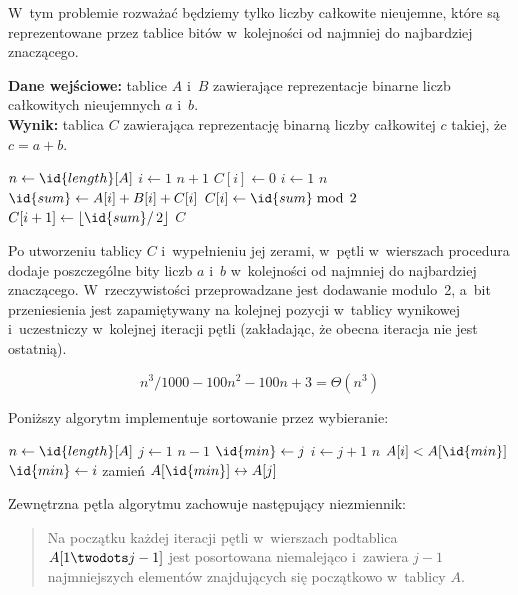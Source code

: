 \exercise %
W~tym problemie rozważać będziemy tylko liczby całkowite nieujemne, które są reprezentowane przez tablice bitów w~kolejności od najmniej do najbardziej znaczącego.

\bigskip
\noindent\textbf{Dane wejściowe:}  tablice $A$ i~$B$ zawierające reprezentacje binarne  liczb całkowitych nieujemnych $a$ i~$b$.\\
\textbf{Wynik:}  tablica $C$ zawierająca reprezentację binarną  liczby całkowitej $c$ takiej, że $c=a+b$.

\begin{codebox}
\li	$n\gets\id{length}[A]$
\li	\For $i\gets1$ \To $n+1$
\li		\Do $C[i]\gets0$
		\End
\li	\For $i\gets1$ \To $n$ \label{li:binary-add-for-begin}
\li		\Do
			$\id{sum}\gets A[i]+B[i]+C[i]$
\li			$C[i]\gets\id{sum}\bmod\,2$
\li			$C[i+1]\gets\lfloor\id{sum}/\,2\rfloor$
		\End \label{li:binary-add-for-end}
\li	\Return $C$
\end{codebox}

Po utworzeniu tablicy $C$ i~wypełnieniu jej zerami, w~pętli  w~wierszach \twodashes{\ref{li:binary-add-for-begin}}{\ref{li:binary-add-for-end}} procedura dodaje poszczególne bity liczb $a$ i~$b$ w~kolejności od najmniej do najbardziej znaczącego. W~rzeczywistości przeprowadzane jest dodawanie modulo~2, a~bit przeniesienia jest zapamiętywany na kolejnej pozycji w~tablicy wynikowej i~uczestniczy w~kolejnej iteracji pętli (zakładając, że obecna iteracja nie jest ostatnią).


\exercise %
\[
	n^3\!/1000-100n^2-100n+3 = \Theta(n^3)
\]

\exercise %
Poniższy algorytm implementuje sortowanie przez wybieranie:
\begin{codebox}
\li	$n\gets\id{length}[A]$
\li	\For $j\gets1$ \To $n-1$ \label{li:selection-sort-for-begin}
\li		\Do
			$\id{min}\gets j$
\li			\For $i\gets j+1$ \To $n$
\li				\Do
					\If $A[i]<A[\id{min}]$
\li						\Then $\id{min}\gets i$
						\End
				\End
\li			zamień $A[\id{min}]\leftrightarrow A[j]$
		\End \label{li:selection-sort-for-end}
\end{codebox}
Zewnętrzna pętla algorytmu zachowuje następujący niezmiennik:
\begin{quote}
Na początku każdej iteracji pętli  w~wierszach \twodashes{\ref{li:selection-sort-for-begin}}{\ref{li:selection-sort-for-end}} podtablica $A[1\twodots j-1]$ jest posortowana niemalejąco i~zawiera $j-1$ najmniejszych elementów znajdujących się początkowo w~tablicy $A$.
\end{quote}

